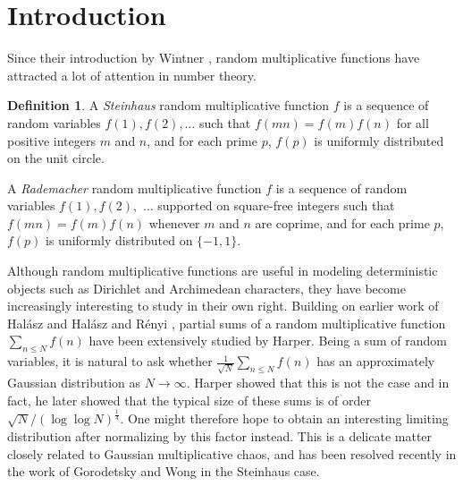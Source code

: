 \documentclass[11pt]{tran-l}
\theoremstyle{definition}
\newtheorem{definition}[theorem]{Definition}
\theoremstyle{remark}
\numberwithin{equation}{section}
\begin{document}
\section{Introduction} 

Since their introduction by Wintner \cite{Wintner1944}, random multiplicative functions have attracted a lot of attention in number theory. 
\begin{definition}
    A \emph{Steinhaus} random multiplicative function $f$ is a sequence of random variables $f(1), f(2), \ldots$ such that $f(mn)=f(m)f(n)$ for all positive integers $m$ and $n$, and for each prime $p$, $f(p)$ is uniformly distributed on the unit circle.

    A \emph{Rademacher} random multiplicative function $f$ is a sequence of random variables $f(1), f(2),$ $\ldots$  supported on square-free integers such that $f(mn) = f(m)f(n)$ whenever $m$ and $n$ are coprime, and for each prime $p$, $f(p)$ is uniformly distributed on $\{-1, 1\}$. 
\end{definition}
Although random multiplicative functions are useful in modeling deterministic objects such as Dirichlet and Archimedean characters, they have become increasingly interesting to study in their own right. Building on earlier work of Hal\'asz \cite{Halasz1977} and Hal\'asz and R\'enyi \cite{HalaszRenyi1961}, partial sums of a random multiplicative function $\sum_{n\leq N} f(n)$ have been extensively studied by Harper. Being a sum of random variables, it is natural to ask whether $\frac{1}{\sqrt N}\sum_{n\leq N} f(n)$ has an approximately Gaussian distribution as $N\to\infty$. 
Harper \cite{Harper2013} showed that this is not the case and in fact, he later showed \cite{Harper2020_MomentsRandomMultiplicativeI} that the typical size of these sums is of order $\sqrt N/(\log\log N)^{\frac14}$. One might therefore hope to obtain 
an interesting limiting distribution after normalizing by this factor instead. This is a delicate matter closely related to Gaussian multiplicative chaos, and has been resolved recently in the work of Gorodetsky and Wong \cite{gorodetsky_wong_2025_limiting} in the Steinhaus case. 
\end{document}
